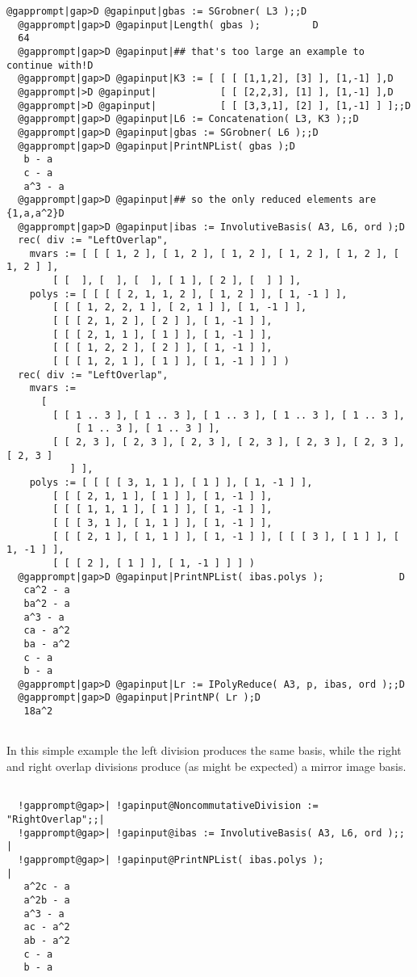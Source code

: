 \documentclass[a4paper,11pt]{report}
\begin{document}
{{\begin{Verbatim}[commandchars=@|D,fontsize=\small,frame=single,label=Example]
  @gapprompt|gap>D @gapinput|gbas := SGrobner( L3 );;D
  @gapprompt|gap>D @gapinput|Length( gbas );         D
  64
  @gapprompt|gap>D @gapinput|## that's too large an example to continue with!D
  @gapprompt|gap>D @gapinput|K3 := [ [ [ [1,1,2], [3] ], [1,-1] ],D
  @gapprompt|>D @gapinput|           [ [ [2,2,3], [1] ], [1,-1] ],D
  @gapprompt|>D @gapinput|           [ [ [3,3,1], [2] ], [1,-1] ] ];;D
  @gapprompt|gap>D @gapinput|L6 := Concatenation( L3, K3 );;D
  @gapprompt|gap>D @gapinput|gbas := SGrobner( L6 );;D
  @gapprompt|gap>D @gapinput|PrintNPList( gbas );D
   b - a 
   c - a 
   a^3 - a 
  @gapprompt|gap>D @gapinput|## so the only reduced elements are {1,a,a^2}D
  @gapprompt|gap>D @gapinput|ibas := InvolutiveBasis( A3, L6, ord );D
  rec( div := "LeftOverlap", 
    mvars := [ [ [ 1, 2 ], [ 1, 2 ], [ 1, 2 ], [ 1, 2 ], [ 1, 2 ], [ 1, 2 ] ], 
        [ [  ], [  ], [  ], [ 1 ], [ 2 ], [  ] ] ], 
    polys := [ [ [ [ 2, 1, 1, 2 ], [ 1, 2 ] ], [ 1, -1 ] ], 
        [ [ [ 1, 2, 2, 1 ], [ 2, 1 ] ], [ 1, -1 ] ], 
        [ [ [ 2, 1, 2 ], [ 2 ] ], [ 1, -1 ] ], 
        [ [ [ 2, 1, 1 ], [ 1 ] ], [ 1, -1 ] ], 
        [ [ [ 1, 2, 2 ], [ 2 ] ], [ 1, -1 ] ], 
        [ [ [ 1, 2, 1 ], [ 1 ] ], [ 1, -1 ] ] ] )
  rec( div := "LeftOverlap", 
    mvars := 
      [ 
        [ [ 1 .. 3 ], [ 1 .. 3 ], [ 1 .. 3 ], [ 1 .. 3 ], [ 1 .. 3 ], 
            [ 1 .. 3 ], [ 1 .. 3 ] ], 
        [ [ 2, 3 ], [ 2, 3 ], [ 2, 3 ], [ 2, 3 ], [ 2, 3 ], [ 2, 3 ], [ 2, 3 ] 
           ] ], 
    polys := [ [ [ [ 3, 1, 1 ], [ 1 ] ], [ 1, -1 ] ], 
        [ [ [ 2, 1, 1 ], [ 1 ] ], [ 1, -1 ] ], 
        [ [ [ 1, 1, 1 ], [ 1 ] ], [ 1, -1 ] ], 
        [ [ [ 3, 1 ], [ 1, 1 ] ], [ 1, -1 ] ], 
        [ [ [ 2, 1 ], [ 1, 1 ] ], [ 1, -1 ] ], [ [ [ 3 ], [ 1 ] ], [ 1, -1 ] ], 
        [ [ [ 2 ], [ 1 ] ], [ 1, -1 ] ] ] )
  @gapprompt|gap>D @gapinput|PrintNPList( ibas.polys );             D
   ca^2 - a 
   ba^2 - a 
   a^3 - a 
   ca - a^2 
   ba - a^2 
   c - a 
   b - a 
  @gapprompt|gap>D @gapinput|Lr := IPolyReduce( A3, p, ibas, ord );;D
  @gapprompt|gap>D @gapinput|PrintNP( Lr );D
   18a^2 
  
\end{Verbatim}
 In this simple example the left division produces the same basis, while the
right and right overlap divisions produce (as might be expected) a mirror
image basis. 

 
\begin{Verbatim}[commandchars=!@|,fontsize=\small,frame=single,label=Example]
  
  !gapprompt@gap>| !gapinput@NoncommutativeDivision := "RightOverlap";;|
  !gapprompt@gap>| !gapinput@ibas := InvolutiveBasis( A3, L6, ord );;  |
  !gapprompt@gap>| !gapinput@PrintNPList( ibas.polys );                |
   a^2c - a 
   a^2b - a 
   a^3 - a 
   ac - a^2 
   ab - a^2 
   c - a 
   b - a 
  
\end{Verbatim}
 }

 }
\end{document}
